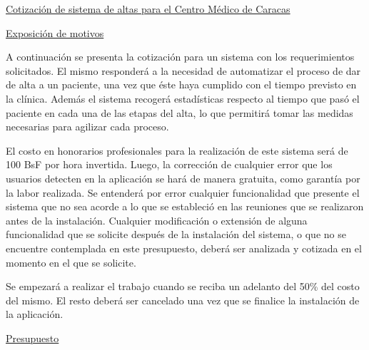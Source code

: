 \documentclass[9pt, letterpaper, oneside]{report}
\begin{document}
  \begin{center}
    \underline{Cotización de sistema de altas para el Centro Médico de Caracas}
  \end{center}

  \underline{Exposición de motivos}

  A continuación se presenta la cotización para un sistema con los
  requerimientos solicitados. El mismo responderá a la necesidad de automatizar
  el proceso de dar de alta a un paciente, una vez que éste haya cumplido
  con el tiempo previsto en la clínica. Además el sistema recogerá estadísticas
  respecto al tiempo que pasó el paciente en cada una de las etapas del alta, lo
  que permitirá tomar las medidas necesarias para agilizar cada proceso.

  El costo en honorarios profesionales para la realización de este sistema será
  de 100 BsF por hora invertida. Luego, la corrección de cualquier error que los
  usuarios detecten en la aplicación se hará de manera gratuita, como garantía
  por la labor realizada. Se entenderá por error cualquier funcionalidad que
  presente el sistema que no sea acorde a lo que se estableció en las reuniones
  que se realizaron antes de la instalación. Cualquier modificación o extensión
  de alguna funcionalidad que se solicite después de la
  instalación del sistema, o que no se encuentre contemplada en este
  presupuesto, deberá ser analizada y cotizada en el momento en el que se
  solicite.

  Se empezará a realizar el trabajo cuando se reciba un adelanto del 50\% del
  costo del mismo. El resto deberá ser cancelado una vez que se finalice la
  instalación de la aplicación.

  \vspace{3mm}

  \underline{Presupuesto}

  \vspace{3mm}
\end{document}
